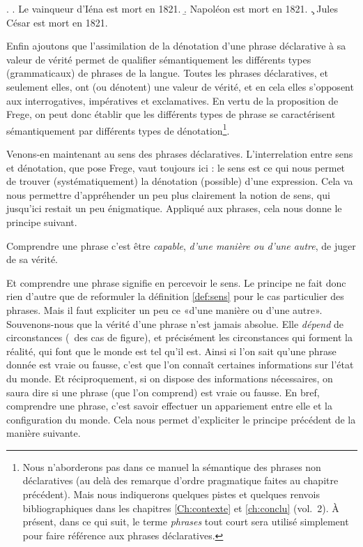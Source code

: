 \ex.  \label{x:1821}
\a. \label{x:1821a}
Le vainqueur d'Iéna est mort en 1821.
\b. \label{x:1821b}
Napoléon est mort en 1821.
\c. \label{x:1821c}
Jules César est mort en 1821.


Enfin ajoutons que l'assimilation de la dénotation d'une phrase
déclarative à sa valeur de vérité permet de qualifier sémantiquement
les différents types (grammaticaux) de phrases de la langue.  Toutes
les phrases déclaratives, et seulement elles, ont (ou dénotent) une
valeur de vérité, et en cela elles s'opposent aux interrogatives,
impératives et exclamatives.  En vertu de la proposition de Frege, on
peut donc établir que les différents types de phrase se caractérisent
sémantiquement par différents types de dénotation\footnote{Nous
  n'aborderons pas dans ce manuel la sémantique des phrases non
  déclaratives (au delà des remarque d'ordre pragmatique faites au
  chapitre précédent).  Mais nous indiquerons quelques pistes et
  quelques renvois bibliographiques dans les chapitres \ref{Ch:contexte} et \ref{ch:conclu} (vol.~2). À
  présent, dans ce qui suit, le terme \emph{phrases} tout court sera
  utilisé simplement pour faire référence aux phrases déclaratives.}.  

Venons-en maintenant au sens des phrases déclaratives.
L'interrelation entre sens et dénotation, que pose Frege, vaut
toujours ici :  le sens est ce qui nous permet de trouver 
(systématiquement) la dénotation (possible) d'une expression.
Cela va nous permettre d'appréhender un peu plus clairement la notion
de sens, qui jusqu'ici restait un peu énigmatique.
Appliqué aux phrases, cela nous donne le principe
suivant. 

\begin{princ}\label{p:vcond1}
Comprendre une phrase c'est être \emph{capable}, \emph{d'une manière
  ou d'une autre}, de juger de sa vérité.
\end{princ}

Et comprendre une phrase signifie en percevoir le sens. Le principe ne
fait donc rien d'autre que de reformuler la définition \ref{def:sens}
pour le cas particulier des phrases.  Mais il faut expliciter un peu
ce «d'une manière ou d'une autre».  Souvenons-nous que la
vérité d'une phrase n'est jamais absolue.  Elle \emph{dépend} de
circonstances (\ie\ des cas de figure), et précisément les circonstances qui
forment la réalité, qui font que le monde est tel qu'il est.  Ainsi si
l'on sait qu'une phrase donnée est vraie ou fausse, c'est que l'on
connaît certaines informations sur l'état du monde.  Et
réciproquement, si on dispose des informations nécessaires, on saura
dire si une phrase (que l'on comprend) est vraie ou fausse.  En bref,
comprendre une phrase, c'est savoir effectuer un appariement entre
elle et la configuration du monde.  Cela nous permet d'expliciter le
principe précédent de la manière suivante.



